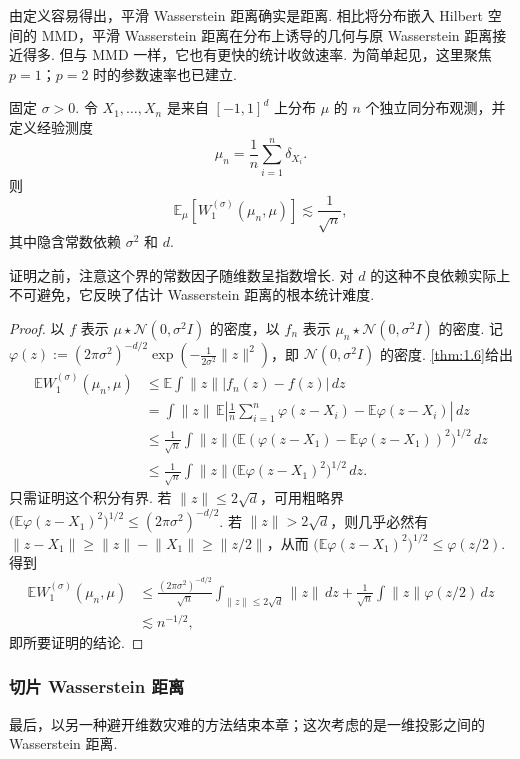 由定义容易得出，平滑 Wasserstein 距离确实是距离. 相比将分布嵌入 Hilbert 空间的 MMD，平滑 Wasserstein 距离在分布上诱导的几何与原 Wasserstein 距离接近得多. 但与 MMD 一样，它也有更快的统计收敛速率. 为简单起见，这里聚焦 $p=1$；$p=2$ 时的参数速率也已建立.
\begin{theorem}\label{thm:2.24}
固定 $\sigma>0$. 令 $X_1,\ldots,X_n$ 是来自 $[-1,1]^d$ 上分布 $\mu$ 的 $n$ 个独立同分布观测，并定义经验测度
$$\mu_n=\frac1n\sum_{i=1}^n\delta_{X_i}.$$
则
$$\mathbb E_\mu[W_1^{(\sigma)}(\mu_n,\mu)]\lesssim\frac1{\sqrt n},$$
其中隐含常数依赖 $\sigma^2$ 和 $d$.
\end{theorem}
证明之前，注意这个界的常数因子随维数呈指数增长. 对 $d$ 的这种不良依赖实际上不可避免，它反映了估计 Wasserstein 距离的根本统计难度.
\begin{proof}
以 $f$ 表示 $\mu\star\mathcal N(0,\sigma^2I)$ 的密度，以 $f_n$ 表示 $\mu_n\star\mathcal N(0,\sigma^2I)$ 的密度. 记 $\varphi(z):=(2\pi\sigma^2)^{-d/2}\exp(-\frac1{2\sigma^2}\lVert z\rVert^2)$，即 $\mathcal N(0,\sigma^2I)$ 的密度. \autoref{thm:1.6}给出
$$\begin{aligned}
\mathbb EW_1^{(\sigma)}(\mu_n,\mu)
&\le\mathbb E\int\lVert z\rVert|f_n(z)-f(z)|\,dz\\
&=\int\lVert z\rVert\,\mathbb E\left|\frac1n\sum_{i=1}^n\varphi(z-X_i)-\mathbb E\varphi(z-X_i)\right|\,dz\\
&\le\frac1{\sqrt n}\int\lVert z\rVert\bigl(\mathbb E(\varphi(z-X_1)-\mathbb E\varphi(z-X_1))^2\bigr)^{1/2}\,dz\\
&\le\frac1{\sqrt n}\int\lVert z\rVert\bigl(\mathbb E\varphi(z-X_1)^2\bigr)^{1/2}\,dz.
\end{aligned}$$
只需证明这个积分有界. 若 $\lVert z\rVert\le2\sqrt d$，可用粗略界 $\bigl(\mathbb E\varphi(z-X_1)^2\bigr)^{1/2}\le(2\pi\sigma^2)^{-d/2}$. 若 $\lVert z\rVert>2\sqrt d$，则几乎必然有 $\lVert z-X_1\rVert\ge\lVert z\rVert-\lVert X_1\rVert\ge\lVert z/2\rVert$，从而 $\bigl(\mathbb E\varphi(z-X_1)^2\bigr)^{1/2}\le\varphi(z/2)$. 得到
$$\begin{aligned}
\mathbb EW_1^{(\sigma)}(\mu_n,\mu)
&\le\frac{(2\pi\sigma^2)^{-d/2}}{\sqrt n}\int_{\lVert z\rVert\le2\sqrt d}\lVert z\rVert\,dz
+\frac1{\sqrt n}\int\lVert z\rVert\varphi(z/2)\,dz\\
&\lesssim n^{-1/2},
\end{aligned}$$
即所要证明的结论.
\end{proof}

\subsubsection{切片 Wasserstein 距离}\label{sec:2.8.4}
最后，以另一种避开维数灾难的方法结束本章；这次考虑的是一维投影之间的 Wasserstein 距离.

